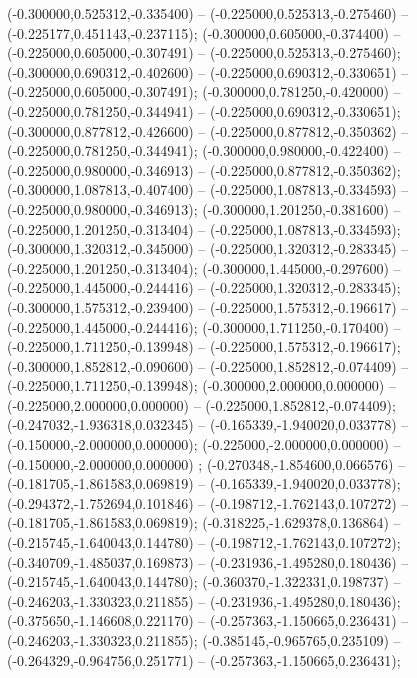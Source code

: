  (-0.300000,0.525312,-0.335400) -- (-0.225000,0.525313,-0.275460) -- (-0.225177,0.451143,-0.237115);
 (-0.300000,0.605000,-0.374400) -- (-0.225000,0.605000,-0.307491) -- (-0.225000,0.525313,-0.275460);
 (-0.300000,0.690312,-0.402600) -- (-0.225000,0.690312,-0.330651) -- (-0.225000,0.605000,-0.307491);
 (-0.300000,0.781250,-0.420000) -- (-0.225000,0.781250,-0.344941) -- (-0.225000,0.690312,-0.330651);
 (-0.300000,0.877812,-0.426600) -- (-0.225000,0.877812,-0.350362) -- (-0.225000,0.781250,-0.344941);
 (-0.300000,0.980000,-0.422400) -- (-0.225000,0.980000,-0.346913) -- (-0.225000,0.877812,-0.350362);
 (-0.300000,1.087813,-0.407400) -- (-0.225000,1.087813,-0.334593) -- (-0.225000,0.980000,-0.346913);
 (-0.300000,1.201250,-0.381600) -- (-0.225000,1.201250,-0.313404) -- (-0.225000,1.087813,-0.334593);
 (-0.300000,1.320312,-0.345000) -- (-0.225000,1.320312,-0.283345) -- (-0.225000,1.201250,-0.313404);
 (-0.300000,1.445000,-0.297600) -- (-0.225000,1.445000,-0.244416) -- (-0.225000,1.320312,-0.283345);
 (-0.300000,1.575312,-0.239400) -- (-0.225000,1.575312,-0.196617) -- (-0.225000,1.445000,-0.244416);
 (-0.300000,1.711250,-0.170400) -- (-0.225000,1.711250,-0.139948) -- (-0.225000,1.575312,-0.196617);
 (-0.300000,1.852812,-0.090600) -- (-0.225000,1.852812,-0.074409) -- (-0.225000,1.711250,-0.139948);
 (-0.300000,2.000000,0.000000) -- (-0.225000,2.000000,0.000000) -- (-0.225000,1.852812,-0.074409);
 (-0.247032,-1.936318,0.032345) -- (-0.165339,-1.940020,0.033778) -- (-0.150000,-2.000000,0.000000);
 (-0.225000,-2.000000,0.000000) -- (-0.150000,-2.000000,0.000000) ;
 (-0.270348,-1.854600,0.066576) -- (-0.181705,-1.861583,0.069819) -- (-0.165339,-1.940020,0.033778);
 (-0.294372,-1.752694,0.101846) -- (-0.198712,-1.762143,0.107272) -- (-0.181705,-1.861583,0.069819);
 (-0.318225,-1.629378,0.136864) -- (-0.215745,-1.640043,0.144780) -- (-0.198712,-1.762143,0.107272);
 (-0.340709,-1.485037,0.169873) -- (-0.231936,-1.495280,0.180436) -- (-0.215745,-1.640043,0.144780);
 (-0.360370,-1.322331,0.198737) -- (-0.246203,-1.330323,0.211855) -- (-0.231936,-1.495280,0.180436);
 (-0.375650,-1.146608,0.221170) -- (-0.257363,-1.150665,0.236431) -- (-0.246203,-1.330323,0.211855);
 (-0.385145,-0.965765,0.235109) -- (-0.264329,-0.964756,0.251771) -- (-0.257363,-1.150665,0.236431);
